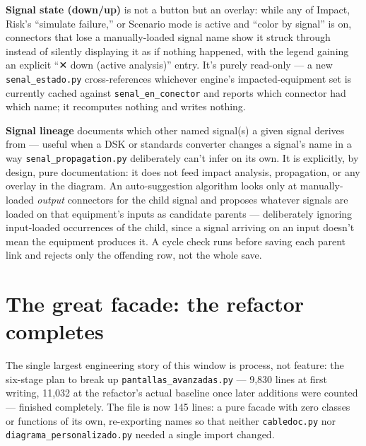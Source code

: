 \documentclass[10.4pt,twocolumn]{article}
\begin{document}
\textbf{Signal state (down/up)} is not a button but an overlay: while any of Impact, Risk's ``simulate failure,'' or Scenario mode is active and ``color by signal'' is on, connectors that lose a manually-loaded signal name show it struck through instead of silently displaying it as if nothing happened, with the legend gaining an explicit ``✕ down (active analysis)'' entry. It's purely read-only --- a new \texttt{senal\_estado.py} cross-references whichever engine's impacted-equipment set is currently cached against \texttt{senal\_en\_conector} and reports which connector had which name; it recomputes nothing and writes nothing.

\textbf{Signal lineage} documents which other named signal(s) a given signal derives from --- useful when a DSK or standards converter changes a signal's name in a way \texttt{senal\_propagation.py} deliberately can't infer on its own. It is explicitly, by design, pure documentation: it does not feed impact analysis, propagation, or any overlay in the diagram. An auto-suggestion algorithm looks only at manually-loaded \emph{output} connectors for the child signal and proposes whatever signals are loaded on that equipment's inputs as candidate parents --- deliberately ignoring input-loaded occurrences of the child, since a signal arriving on an input doesn't mean the equipment produces it. A cycle check runs before saving each parent link and rejects only the offending row, not the whole save.

\section{The great facade: the refactor completes}
\label{sec:refactor}

The single largest engineering story of this window is process, not feature: the six-stage plan to break up \texttt{pantallas\_avanzadas.py} --- 9{,}830 lines at first writing, 11{,}032 at the refactor's actual baseline once later additions were counted --- finished completely. The file is now 145 lines: a pure facade with zero classes or functions of its own, re-exporting names so that neither \texttt{cabledoc.py} nor \texttt{diagrama\_personalizado.py} needed a single import changed.
\end{document}
